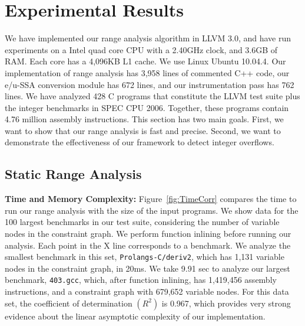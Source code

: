 \documentclass{sigplanconf}[10pt]
\begin{document}
\section{Experimental Results}
\label{sec:exp}

We have implemented our range analysis algorithm in LLVM 3.0, and have run
experiments on a Intel quad core CPU with a 2.40GHz clock, and 3.6GB of RAM.
Each core has a 4,096KB L1 cache.
We use Linux Ubuntu 10.04.4.
Our implementation of range analysis has 3,958 lines of
commented C++ code, our e/u-SSA conversion module has 672 lines, and our
instrumentation pass has 762 lines.
We have analyzed 428 C programs that constitute the LLVM test suite plus the
integer benchmarks in SPEC CPU 2006.
Together, these programs contain 4.76 million assembly instructions.
This section has two main goals.
First, we want to show that our range analysis is fast and precise.
Second, we want to demonstrate the effectiveness of our framework to detect
integer overflows.

\subsection{Static Range Analysis}
\label{sub:range}

\noindent
\textbf{Time and Memory Complexity: }
Figure~\ref{fig:TimeCorr} compares the time to run our range analysis with the size of
the input programs.
We show data for the 100 largest benchmarks in our test suite, considering the number
of variable nodes in the constraint graph.
We perform function inlining before running our analysis.
Each point in the X line corresponds to a benchmark.
We analyze the smallest benchmark in this set, \texttt{Prolangs-C/deriv2}, which
has 1,131 variable nodes in the constraint graph, in 20ms.
We take 9.91 sec to analyze our largest benchmark, \texttt{403.gcc}, which,
after function inlining, has 1,419,456 assembly instructions, and a
constraint graph with 679,652 variable nodes.
For this data set, the coefficient of determination $(R^2)$ is 0.967, which
provides very strong evidence about the linear asymptotic complexity of our
implementation.
\end{document}
